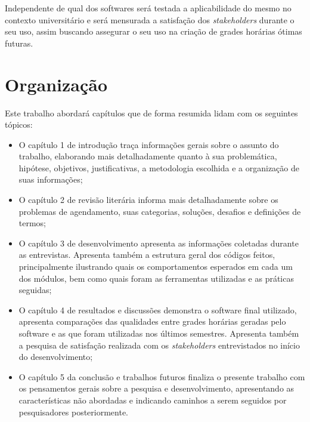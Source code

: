 Independente de qual dos softwares será testada a aplicabilidade do mesmo no contexto universitário e será mensurada a satisfação dos \textit{stakeholders} durante o seu uso, assim buscando assegurar o seu uso na criação de grades horárias ótimas futuras.

\section{Organização} %

Este trabalho abordará capítulos que de forma resumida lidam com os seguintes tópicos:

\begin{itemize}
  \item O capítulo 1 de introdução traça informações gerais sobre o assunto do trabalho, elaborando mais detalhadamente quanto à sua problemática, hipótese, objetivos, justificativas, a metodologia escolhida e a organização de suas informações;
  \item O capítulo 2 de revisão literária informa mais detalhadamente sobre os problemas de agendamento, suas categorias, soluções, desafios e definições de termos;
  \item O capítulo 3 de desenvolvimento apresenta as informações coletadas durante as entrevistas. Apresenta também a estrutura geral dos códigos feitos, principalmente ilustrando quais os comportamentos esperados em cada um dos módulos, bem como quais foram as ferramentas utilizadas e as práticas seguidas;
  \item O capítulo 4 de resultados e discussões demonstra o software final utilizado, apresenta comparações das qualidades entre grades horárias geradas pelo software e as que foram utilizadas nos últimos semestres. Apresenta também a pesquisa de satisfação realizada com os \textit{stakeholders} entrevistados no início do desenvolvimento;
  \item O capítulo 5 da conclusão e trabalhos futuros finaliza o presente trabalho com os pensamentos gerais sobre a pesquisa e desenvolvimento, apresentando as características não abordadas e indicando caminhos a serem seguidos por pesquisadores posteriormente.
\end{itemize}

